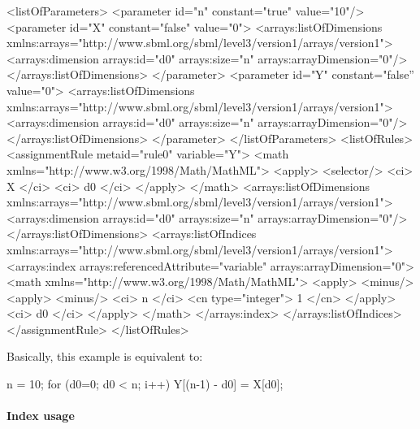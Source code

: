 \begin{example}[showstringspaces=false]
<listOfParameters>
  <parameter id="n" constant="true" value="10"/>
  <parameter id="X" constant="false" value="0">
    <arrays:listOfDimensions xmlns:arrays="http://www.sbml.org/sbml/level3/version1/arrays/version1">
      <arrays:dimension arrays:id="d0" arrays:size="n" arrays:arrayDimension="0"/>
    </arrays:listOfDimensions>
  </parameter>
  <parameter id="Y" constant="false'' value="0">
    <arrays:listOfDimensions xmlns:arrays="http://www.sbml.org/sbml/level3/version1/arrays/version1">
      <arrays:dimension arrays:id="d0" arrays:size="n" arrays:arrayDimension="0"/>
    </arrays:listOfDimensions>
  </parameter>
</listOfParameters>
<listOfRules>
  <assignmentRule metaid="rule0" variable="Y">
    <math xmlns="http://www.w3.org/1998/Math/MathML">
      <apply>
        <selector/>
        <ci> X </ci>
        <ci> d0 </ci>
      </apply>
    </math>
    <arrays:listOfDimensions xmlns:arrays="http://www.sbml.org/sbml/level3/version1/arrays/version1">
      <arrays:dimension arrays:id="d0" arrays:size="n" arrays:arrayDimension="0"/>
    </arrays:listOfDimensions>
    <arrays:listOfIndices xmlns:arrays="http://www.sbml.org/sbml/level3/version1/arrays/version1">
      <arrays:index arrays:referencedAttribute="variable" arrays:arrayDimension="0">
        <math xmlns="http://www.w3.org/1998/Math/MathML">
          <apply>
            <minus/>
            <apply>
              <minus/>
              <ci> n </ci>
              <cn type="integer"> 1 </cn>
            </apply>
            <ci> d0 </ci>
          </apply>
        </math>
      </arrays:index>
    </arrays:listOfIndices>
  </assignmentRule>
</listOfRules>
\end{example}

Basically, this example is equivalent to:

\begin{example}
n = 10;
for (d0=0; d0 < n; i++) {
  Y[(n-1) - d0] = X[d0];
}
\end{example}

\paragraph{Index usage}

